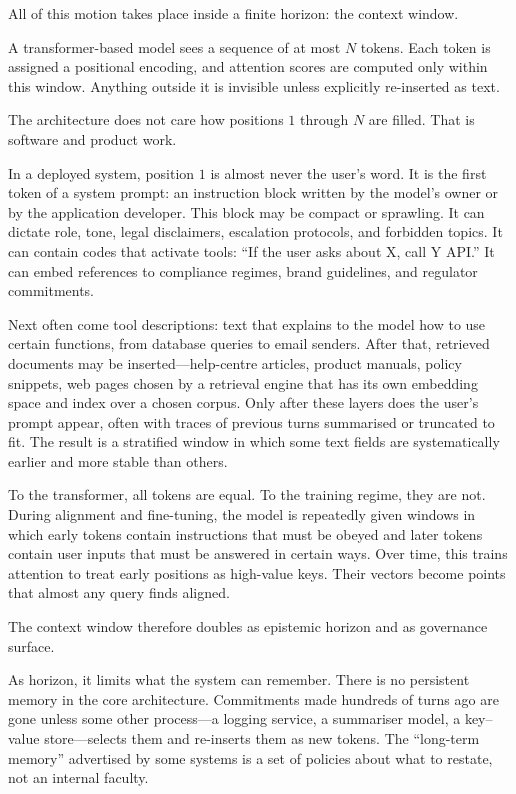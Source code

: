 \documentclass[12pt,a4paper]{article}
\begin{document}
All of this motion takes place inside a finite horizon: the context window.

A transformer-based model sees a sequence of at most $N$ tokens. Each token is assigned a positional encoding, and attention scores are computed only within this window. Anything outside it is invisible unless explicitly re-inserted as text.

The architecture does not care how positions $1$ through $N$ are filled. That is software and product work.

In a deployed system, position $1$ is almost never the user's word. It is the first token of a system prompt: an instruction block written by the model's owner or by the application developer. This block may be compact or sprawling. It can dictate role, tone, legal disclaimers, escalation protocols, and forbidden topics. It can contain codes that activate tools: ``If the user asks about X, call Y API.'' It can embed references to compliance regimes, brand guidelines, and regulator commitments.

Next often come tool descriptions: text that explains to the model how to use certain functions, from database queries to email senders. After that, retrieved documents may be inserted---help-centre articles, product manuals, policy snippets, web pages chosen by a retrieval engine that has its own embedding space and index over a chosen corpus. Only after these layers does the user's prompt appear, often with traces of previous turns summarised or truncated to fit. The result is a stratified window in which some text fields are systematically earlier and more stable than others.

To the transformer, all tokens are equal. To the training regime, they are not. During alignment and fine-tuning, the model is repeatedly given windows in which early tokens contain instructions that must be obeyed and later tokens contain user inputs that must be answered in certain ways. Over time, this trains attention to treat early positions as high-value keys. Their vectors become points that almost any query finds aligned.

The context window therefore doubles as epistemic horizon and as governance surface.

As horizon, it limits what the system can remember. There is no persistent memory in the core architecture. Commitments made hundreds of turns ago are gone unless some other process---a logging service, a summariser model, a key--value store---selects them and re-inserts them as new tokens. The ``long-term memory'' advertised by some systems is a set of policies about what to restate, not an internal faculty.
\end{document}
